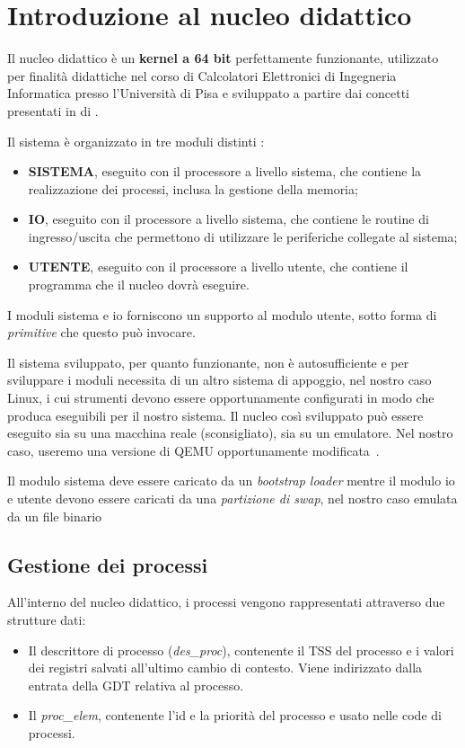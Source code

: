 \chapter{Introduzione al nucleo didattico}
Il nucleo didattico è un \textbf{kernel a 64 bit} perfettamente funzionante, utilizzato per finalità didattiche nel corso di Calcolatori Elettronici di Ingegneria Informatica presso l'Università di Pisa e sviluppato a partire dai concetti presentati in  di \citeauthor{frosini:calcolatori3}\cite{frosini:calcolatori3}.

Il sistema è organizzato in tre moduli distinti \cite{lettieri:nucleo}:
\begin{itemize}
	\item \textbf{SISTEMA}, eseguito con il processore a livello sistema, che contiene la realizzazione dei processi, inclusa la gestione della memoria;
	\item \textbf{IO}, eseguito con il processore a livello sistema, che contiene le routine di ingresso/uscita che permettono di utilizzare le periferiche collegate al sistema;
	\item \textbf{UTENTE}, eseguito con il processore a livello utente, che contiene il programma che il nucleo dovrà eseguire.
\end{itemize}
I moduli sistema e io forniscono un supporto al modulo utente, sotto forma di \emph{primitive} che questo può invocare.

Il sistema sviluppato, per quanto funzionante, non è autosufficiente e per sviluppare i moduli necessita di un altro sistema di appoggio, nel nostro caso Linux, i cui strumenti devono essere opportunamente configurati in modo che produca eseguibili per il nostro sistema. Il nucleo così sviluppato può essere eseguito sia su una macchina reale (sconsigliato), sia su un emulatore. Nel nostro caso, useremo una versione di QEMU opportunamente modificata~\cite{lettieri:istruzioni-nucleo}.

Il modulo sistema deve essere caricato da un \emph{bootstrap loader} mentre il modulo io e utente devono essere caricati da una \emph{partizione di swap}, nel nostro caso emulata da un file binario

\section{Gestione dei processi}
All'interno del nucleo didattico, i processi vengono rappresentati attraverso due strutture dati:
\begin{itemize}
	\item Il descrittore di processo (\emph{des\_proc}), contenente il TSS del processo e i valori dei registri salvati all'ultimo cambio di contesto. Viene indirizzato dalla entrata della GDT relativa al processo.
	\item Il \emph{proc\_elem}, contenente l'id e la priorità del processo e usato nelle code di processi.
\end{itemize}

